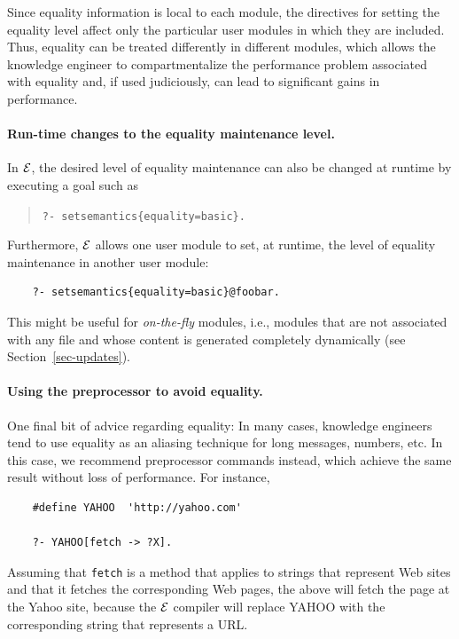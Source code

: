 \documentclass[11pt]{article}
\newcommand{\ERGO}{\mbox{\ensuremath{\cal{E}}\smaller{{\sc{RGO}}}}\xspace}
\newcommand{\FLSYSTEM}{\ERGO}
\begin{document}
Since equality information is local to each module, the directives for
setting the equality level affect only the particular user modules in which
they are included.  Thus, equality can be treated differently in different
modules, which allows the knowledge engineer to compartmentalize the performance
problem associated with equality and, if used judiciously, can lead to
significant gains in performance.

\paragraph{Run-time changes to the equality maintenance level.}
In \FLSYSTEM, the desired level of equality maintenance can also be changed at
runtime by executing a goal such as
\begin{quote}
 {\tt ?- setsemantics\{equality=basic\}.}
\end{quote}
Furthermore, \FLSYSTEM allows one user module to set, at runtime, the level
of equality maintenance in another user module:
\begin{verbatim}
    ?- setsemantics{equality=basic}@foobar.
\end{verbatim}
This might be useful for \emph{on-the-fly} modules, i.e., modules that
are not associated with any file and whose content is generated completely
dynamically (see Section~\ref{sec-updates}).

\paragraph{Using the preprocessor to avoid equality.}
One final bit of advice regarding equality: In many cases, knowledge
engineers tend to use
equality as an aliasing technique for long messages, numbers, etc. In this
case, we recommend preprocessor commands instead, which achieve the same
result without loss of performance. For instance,

\begin{verbatim}
    #define YAHOO  'http://yahoo.com'  

    ?- YAHOO[fetch -> ?X].
\end{verbatim}
\noindent
Assuming that {\tt fetch} is a method that applies to strings that
represent Web sites and that it fetches the corresponding Web pages, the above
will fetch the page at the Yahoo site, because the \FLSYSTEM compiler will
replace YAHOO with the corresponding string that represents a URL.
\end{document}

